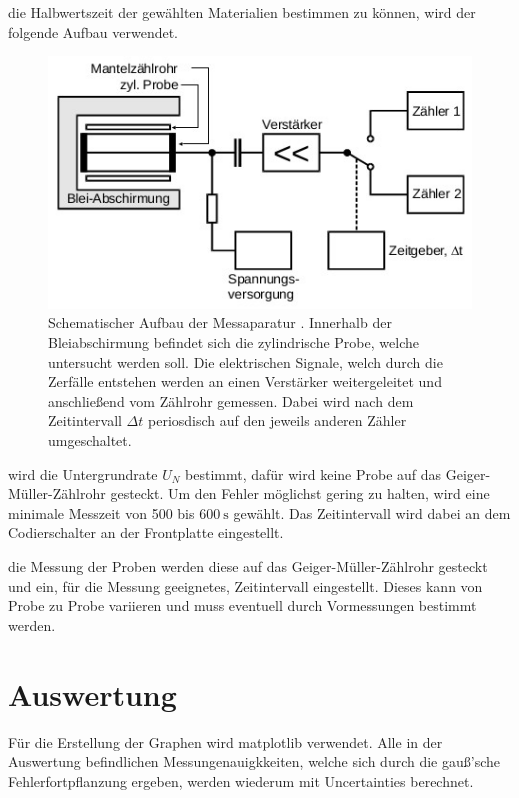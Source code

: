     \justifying die Halbwertszeit der gewählten Materialien bestimmen zu können, wird der folgende Aufbau verwendet.
    \begin{figure}
        \centering
        \includegraphics[width=\textwidth]{images/aufbau.jpg}
        \caption{Schematischer Aufbau der Messaparatur \cite{V702}. Innerhalb der Bleiabschirmung befindet sich
        die zylindrische Probe, welche untersucht werden soll. Die elektrischen Signale,
        welch durch die Zerfälle entstehen werden an einen Verstärker weitergeleitet und
        anschließend vom Zählrohr gemessen. Dabei wird nach dem Zeitintervall $\Delta t$ periosdisch auf
        den jeweils anderen Zähler umgeschaltet.
        }
        \label{fig:3}
    \end{figure}
    \justifying wird die Untergrundrate $U_N$ bestimmt, dafür wird keine Probe auf das Geiger-Müller-Zählrohr gesteckt.
    Um den Fehler möglichst gering zu halten, wird eine  minimale Messzeit von 500 bis $\SI{600}{\second} $ gewählt. Das Zeitintervall
    wird dabei an dem Codierschalter an der Frontplatte eingestellt.

    
    \justifying die Messung der Proben werden diese auf das Geiger-Müller-Zählrohr gesteckt und ein,
    für die Messung geeignetes, Zeitintervall eingestellt. Dieses kann von Probe zu Probe variieren und muss
    eventuell durch Vormessungen bestimmt werden.


\section{Auswertung}
Für die Erstellung der Graphen wird matplotlib \cite{matplotlib} verwendet.
Alle in der Auswertung befindlichen Messungenauigkkeiten, welche sich durch die gauß'sche Fehlerfortpflanzung ergeben,
werden wiederum mit Uncertainties \cite{uncertainties} berechnet.\\

